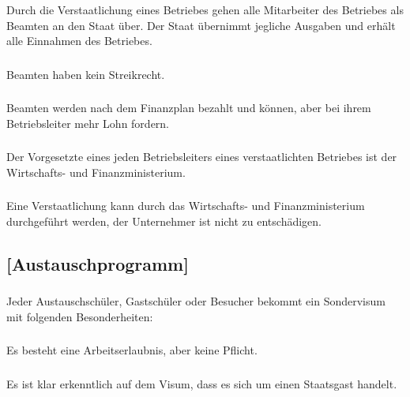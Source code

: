 \documentclass[a4paper, 11pt]{report}
\let\oldsubsection\subsection
\renewcommand{\subsection}{\leftskip=40pt\oldsubsection}
\begin{document}
 
\subsubsection{}
Durch die Verstaatlichung eines Betriebes gehen alle Mitarbeiter des Betriebes als Beamten an den Staat über. Der Staat übernimmt jegliche Ausgaben und erhält alle Einnahmen des Betriebes. 

 
\subsubsection{}
Beamten haben kein Streikrecht. 

 
\subsubsection{}
Beamten werden nach dem Finanzplan bezahlt und können, aber bei ihrem Betriebsleiter mehr Lohn fordern. 

 
\subsubsection{}
Der Vorgesetzte eines jeden Betriebsleiters eines verstaatlichten Betriebes ist der Wirtschafts- und Finanzministerium. 

\subsubsection{}
Eine Verstaatlichung kann durch das Wirtschafts- und Finanzministerium durchgeführt werden, der Unternehmer ist nicht zu entschädigen.  


 

\subsection{[Austauschprogramm]}

 
\subsubsection{}
Jeder Austauschschüler, Gastschüler oder Besucher bekommt ein Sondervisum mit folgenden Besonderheiten: 

\subsubsection{}
Es besteht eine Arbeitserlaubnis, aber keine Pflicht. 

\subsubsection{}
Es ist klar erkenntlich auf dem Visum, dass es sich um einen Staatsgast handelt. 
\end{document}
